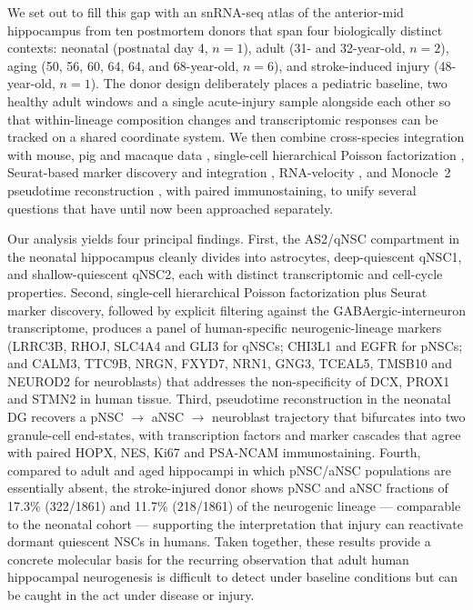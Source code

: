 \documentclass[11pt]{article}
\begin{document}
We set out to fill this gap with an snRNA-seq atlas of the anterior-mid
hippocampus from ten postmortem donors that span four biologically distinct
contexts: neonatal (postnatal day 4, $n=1$), adult (31- and 32-year-old,
$n=2$), aging (50, 56, 60, 64, 64, and 68-year-old, $n=6$), and stroke-induced
injury (48-year-old, $n=1$). The donor design deliberately places a pediatric
baseline, two healthy adult windows and a single acute-injury sample alongside
each other so that within-lineage composition changes and transcriptomic
responses can be tracked on a shared coordinate system. We then combine
cross-species integration with mouse, pig and macaque data
\cite{hochgerner2018conserved,franjic2022transcriptomic}, single-cell
hierarchical Poisson factorization \cite{levitin2019gene}, Seurat-based
marker discovery and integration \cite{butler2018integrating}, RNA-velocity
\cite{lamanno2018rna}, and Monocle~2 pseudotime reconstruction
\cite{trapnell2014dynamics}, with paired immunostaining, to unify several
questions that have until now been approached separately.

Our analysis yields four principal findings. First, the AS2/qNSC compartment
in the neonatal hippocampus cleanly divides into astrocytes, deep-quiescent
qNSC1, and shallow-quiescent qNSC2, each with distinct transcriptomic and
cell-cycle properties. Second, single-cell hierarchical Poisson factorization
plus Seurat marker discovery, followed by explicit filtering against the
GABAergic-interneuron transcriptome, produces a panel of human-specific
neurogenic-lineage markers (LRRC3B, RHOJ, SLC4A4 and GLI3 for qNSCs; CHI3L1
and EGFR for pNSCs; and CALM3, TTC9B, NRGN, FXYD7, NRN1, GNG3, TCEAL5,
TMSB10 and NEUROD2 for neuroblasts) that addresses the non-specificity of
DCX, PROX1 and STMN2 in human tissue. Third, pseudotime reconstruction in
the neonatal DG recovers a pNSC $\rightarrow$ aNSC $\rightarrow$ neuroblast
trajectory that bifurcates into two granule-cell end-states, with transcription
factors and marker cascades that agree with paired HOPX, NES, Ki67 and
PSA-NCAM immunostaining. Fourth, compared to adult and aged hippocampi in
which pNSC/aNSC populations are essentially absent, the stroke-injured
donor shows pNSC and aNSC fractions of 17.3\% (322/1861) and 11.7\%
(218/1861) of the neurogenic lineage --- comparable to the neonatal cohort
--- supporting the interpretation that injury can reactivate dormant
quiescent NSCs in humans. Taken together, these results provide a concrete
molecular basis for the recurring observation that adult human hippocampal
neurogenesis is difficult to detect under baseline conditions but can be
caught in the act under disease or injury.
\end{document}
